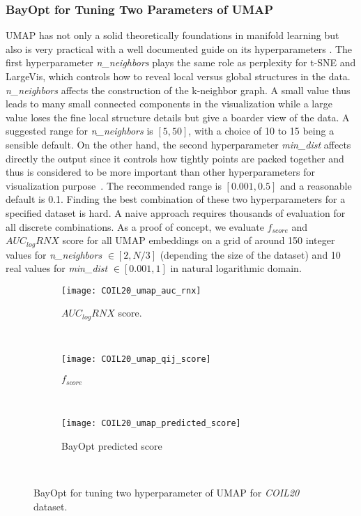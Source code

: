 \subsubsection{BayOpt for Tuning Two Parameters of UMAP}\label{sec:result:bo:umap}

UMAP has not only a solid theoretically foundations in manifold learning but also is very practical with a well documented guide on its hyperparameters \cite{mcinnes2018umap-software}.
The first hyperparameter \emph{n\_neighbors} plays the same role as perplexity for t-SNE and LargeVis, which controls how to reveal local versus global structures in the data.
\emph{n\_neighbors} affects the construction of the k-neighbor graph.
A small value thus leads to many small connected components in the visualization while a large value loses the fine local structure details but give a boarder view of the data.
A suggested range for \emph{n\_neighbors} is $[5, 50]$, with a choice of 10 to 15 being a sensible default.
On the other hand, the second hyperparameter \emph{min\_dist} affects directly the output since it controls how tightly points are packed together and thus is considered to be more important than other hyperparameters for visualization purpose~\cite[Sec.4.3]{mcinnes2018umap}.
The recommended range is $[0.001, 0.5]$ and a reasonable default is 0.1.
Finding the best combination of these two hyperparameters for a specified dataset is hard.
A naive approach requires thousands of evaluation for all discrete combinations.
As a proof of concept, we evaluate $f_{score}$ and $AUC_{log}RNX$ score for all UMAP embeddings on a grid of around 150 integer values for \emph{n\_neighbors} $\in [2, N/3]$ (depending the size of the dataset) and 10 real values for \emph{min\_dist} $\in [0.001, 1]$ in natural logarithmic domain.

\begin{figure}%
    \begin{subfigure}[b]{.76\linewidth}
        \texttt{[image: COIL20\_umap\_auc\_rnx]}
        \caption{$AUC_{log}RNX$ score.}
        \label{fig:bo:umap:COIL20:rnx}
    \end{subfigure}
    ~
    \begin{subfigure}[b]{.76\linewidth}
        \texttt{[image: COIL20\_umap\_qij\_score]}
        \caption{$f_{score}$}
        \label{fig:bo:umap:COIL20:fscore}
    \end{subfigure}
    ~
    \begin{subfigure}[b]{.98\linewidth}
        \centering
        \texttt{[image: COIL20\_umap\_predicted\_score]}
        \caption{BayOpt predicted score}
        \label{fig:bo:umap:COIL20:prediction}
    \end{subfigure}
    ~
    \caption{BayOpt for tuning two hyperparameter of UMAP for \emph{COIL20} dataset.}
    \label{fig:bo:umap:COIL20}
\end{figure}

